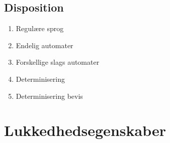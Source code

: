 \documentclass[a4, danish]{article}
\begin{document}
\newpage
\subsection{Disposition}
\begin{enumerate}
  \item Regulære sprog
  \item Endelig automater 
  \item Forskellige slags automater 
  \item Determinisering 
  \item Determinisering bevis
\end{enumerate}

\newpage
\section{Lukkedhedsegenskaber}
\end{document}
